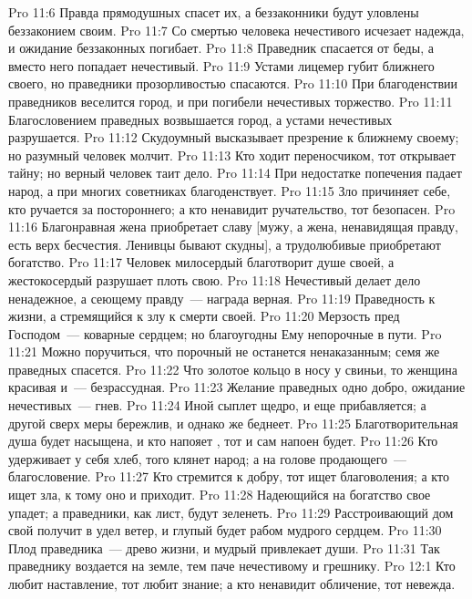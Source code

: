 \vs Pro 11:6 Правда прямодушных спасет их, а беззаконники будут уловлены беззаконием своим.
\vs Pro 11:7 Со смертью человека нечестивого исчезает надежда, и ожидание беззаконных погибает.
\vs Pro 11:8 Праведник спасается от беды, а вместо него попадает  нечестивый.
\vs Pro 11:9 Устами лицемер губит ближнего своего, но праведники прозорливостью спасаются.
\vs Pro 11:10 При благоденствии праведников веселится город, и при погибели нечестивых  торжество.
\vs Pro 11:11 Благословением праведных возвышается город, а устами нечестивых разрушается.
\vs Pro 11:12 Скудоумный высказывает презрение к ближнему своему; но разумный человек молчит.
\vs Pro 11:13 Кто ходит переносчиком, тот открывает тайну; но верный человек таит дело.
\vs Pro 11:14 При недостатке попечения падает народ, а при многих советниках благоденствует.
\vs Pro 11:15 Зло причиняет себе, кто ручается за постороннего; а кто ненавидит ручательство, тот безопасен.
\vs Pro 11:16 Благонравная жена приобретает славу [мужу, а жена, ненавидящая правду, есть верх бесчестия. Ленивцы бывают скудны], а трудолюбивые приобретают богатство.
\vs Pro 11:17 Человек милосердый благотворит душе своей, а жестокосердый разрушает плоть свою.
\vs Pro 11:18 Нечестивый делает дело ненадежное, а сеющему правду~--- награда верная.
\vs Pro 11:19 Праведность  к жизни, а стремящийся к злу  к смерти своей.
\vs Pro 11:20 Мерзость пред Господом~--- коварные сердцем; но благоугодны Ему непорочные в пути.
\vs Pro 11:21 Можно поручиться, что порочный не останется ненаказанным; семя же праведных спасется.
\vs Pro 11:22 Что золотое кольцо в носу у свиньи, то женщина красивая и~--- безрассудная.
\vs Pro 11:23 Желание праведных  одно добро, ожидание нечестивых~--- гнев.
\vs Pro 11:24 Иной сыплет щедро, и  еще прибавляется; а другой сверх меры бережлив, и однако же беднеет.
\vs Pro 11:25 Благотворительная душа будет насыщена, и кто напояет , тот и сам напоен будет.
\vs Pro 11:26 Кто удерживает у себя хлеб, того клянет народ; а на голове продающего~--- благословение.
\vs Pro 11:27 Кто стремится к добру, тот ищет благоволения; а кто ищет зла, к тому оно и приходит.
\vs Pro 11:28 Надеющийся на богатство свое упадет; а праведники, как лист, будут зеленеть.
\vs Pro 11:29 Расстроивающий дом свой получит в удел ветер, и глупый будет рабом мудрого сердцем.
\vs Pro 11:30 Плод праведника~--- древо жизни, и мудрый привлекает души.
\vs Pro 11:31 Так праведнику воздается на земле, тем паче нечестивому и грешнику.
\vs Pro 12:1 Кто любит наставление, тот любит знание; а кто ненавидит обличение, тот невежда.
